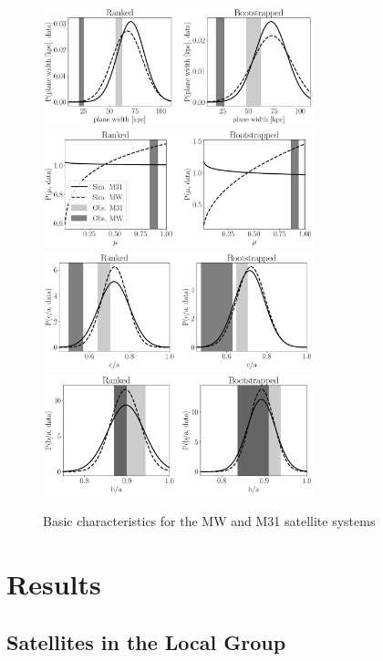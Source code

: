 \documentclass[a4paper,fleqn,usenatbib]{mnras}
\begin{document}
\begin{figure}
\centering
\includegraphics[width=0.7\textwidth]{distribution_width.pdf}
\includegraphics[width=0.7\textwidth]{distribution_mu.pdf}
\includegraphics[width=0.7\textwidth]{distribution_ca_ratio.pdf}
\includegraphics[width=0.7\textwidth]{distribution_ba_ratio.pdf}
\caption{Basic characteristics for the MW and M31 satellite systems
\label{fig:general}}
\end{figure}



\section{Results}
\label{sec:results}

\subsection{Satellites in the Local Group}
\end{document}
